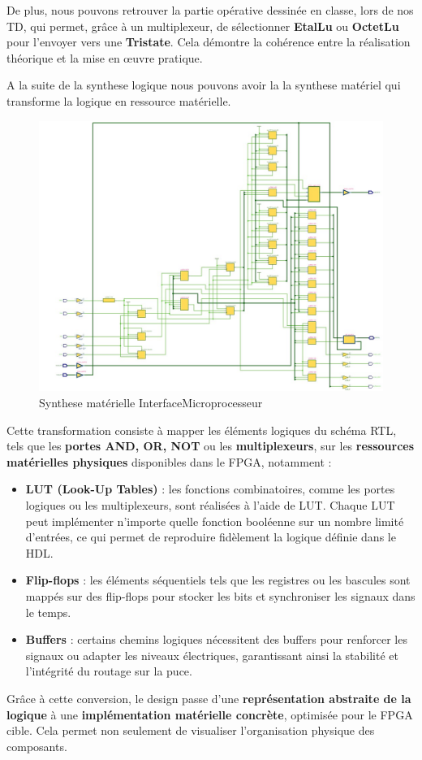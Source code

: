 De plus, nous pouvons retrouver la partie opérative dessinée en classe, lors de nos TD, qui permet, grâce à un multiplexeur, de sélectionner \textbf{EtalLu} ou \textbf{OctetLu} pour l'envoyer vers une \textbf{Tristate}.  
Cela démontre la cohérence entre la réalisation théorique et la mise en œuvre pratique.
\newline

A la suite de la synthese logique nous pouvons avoir la la synthese matériel qui transforme la logique en ressource matérielle.

\begin{figure}[H]
    \centering
    \includegraphics[width=0.9\linewidth]{images/Synthe/RTL_HARD_HDL.jpg}
    \caption{Synthese matérielle InterfaceMicroprocesseur}
    \label{fig:placeholder}
\end{figure}

Cette transformation consiste à mapper les éléments logiques du schéma RTL, tels que les \textbf{portes AND, OR, NOT} ou les \textbf{multiplexeurs}, sur les \textbf{ressources matérielles physiques} disponibles dans le FPGA, notamment :  
\newline

\begin{itemize}
    \item \textbf{LUT (Look-Up Tables)} : les fonctions combinatoires, comme les portes logiques ou les multiplexeurs, sont réalisées à l’aide de LUT. Chaque LUT peut implémenter n’importe quelle fonction booléenne sur un nombre limité d’entrées, ce qui permet de reproduire fidèlement la logique définie dans le HDL.
    \item \textbf{Flip-flops} : les éléments séquentiels tels que les registres ou les bascules sont mappés sur des flip-flops pour stocker les bits et synchroniser les signaux dans le temps.
    \item \textbf{Buffers} : certains chemins logiques nécessitent des buffers pour renforcer les signaux ou adapter les niveaux électriques, garantissant ainsi la stabilité et l’intégrité du routage sur la puce.
\end{itemize}

Grâce à cette conversion, le design passe d’une \textbf{représentation abstraite de la logique} à une \textbf{implémentation matérielle concrète}, optimisée pour le FPGA cible. Cela permet non seulement de visualiser l’organisation physique des composants.
\newline